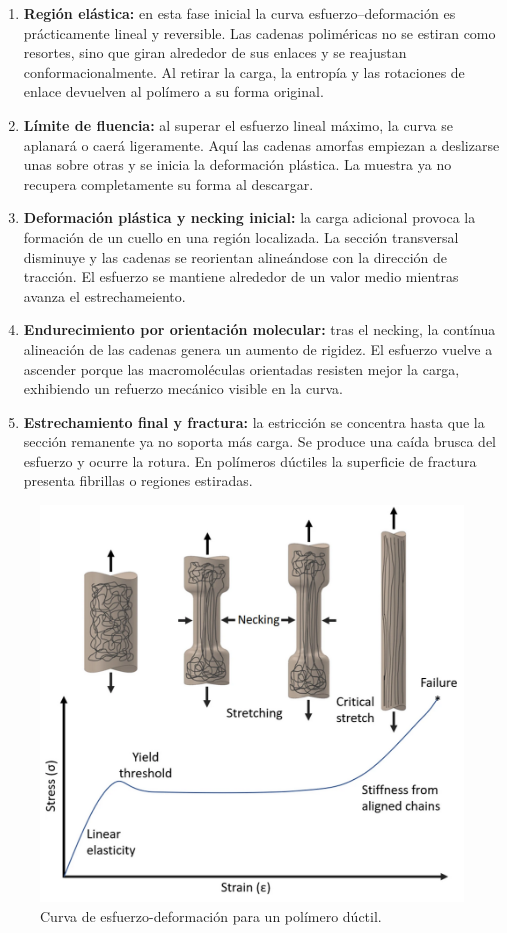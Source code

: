 \begin{enumerate}

\item \textbf{Región elástica:} en esta fase inicial la curva esfuerzo–deformación es prácticamente lineal y reversible. Las cadenas poliméricas no se estiran como resortes, sino que giran alrededor de sus enlaces y se reajustan conformacionalmente. Al retirar la carga, la entropía y las rotaciones de enlace devuelven al polímero a su forma original.

\item \textbf{Límite de fluencia:} al superar el esfuerzo lineal máximo, la curva se aplanará o caerá ligeramente. Aquí las cadenas amorfas empiezan a deslizarse unas sobre otras y se inicia la deformación plástica. La muestra ya no recupera completamente su forma al descargar.

\item \textbf{Deformación plástica y necking inicial:} la carga adicional provoca la formación de un cuello en una región localizada. La sección transversal disminuye y las cadenas se reorientan alineándose con la dirección de tracción. El esfuerzo se mantiene alrededor de un valor medio mientras avanza el estrechameiento.

\item \textbf{Endurecimiento por orientación molecular:} tras el necking, la contínua alineación de las cadenas genera un aumento de rigidez. El esfuerzo vuelve a ascender porque las macromoléculas orientadas resisten mejor la carga, exhibiendo un refuerzo mecánico visible en la curva.

\item \textbf{Estrechamiento final y fractura:} la estricción se concentra hasta que la sección remanente ya no soporta más carga. Se produce una caída brusca del esfuerzo y ocurre la rotura. En polímeros dúctiles la superficie de fractura presenta fibrillas o regiones estiradas.

\end{enumerate}

\begin{figure}[h!]
    \centering
    \includegraphics[width=0.7\linewidth]{imgs/estre.png}
    \caption{Curva de esfuerzo-deformación para un polímero dúctil.\cite{tensileplastic}}
    \label{plastens}
\end{figure}

